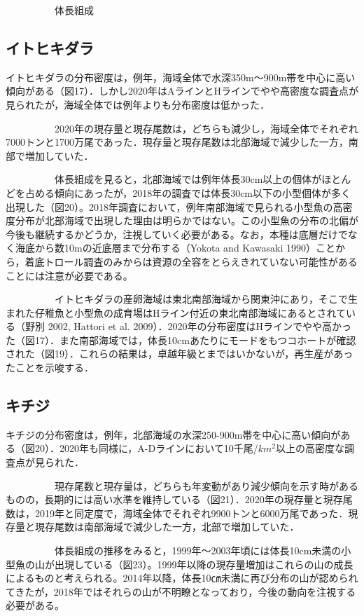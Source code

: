 \documentclass[11pt]{article} %
\begin{document}
\begin{linenumbers}
\ \ \ \ \ \ \ \ \ \ 
体長組成

\subsection{イトヒキダラ}
イトヒキダラの分布密度は，例年，海域全体で水深350m～900m帯を中心に高い傾向がある（図17）．しかし2020年はAラインとHラインでやや高密度な調査点が見られたが，海域全体では例年よりも分布密度は低かった．

\ \ \ \ \ \ \ \ \ \ 
2020年の現存量と現存尾数は，どちらも減少し，海域全体でそれぞれ7000トンと1700万尾であった．現存量と現存尾数は北部海域で減少した一方，南部で増加していた．

\ \ \ \ \ \ \ \ \ \ 
体長組成を見ると，北部海域では例年体長30cm以上の個体がほとんどを占める傾向にあったが，2018年の調査では体長30cm以下の小型個体が多く出現した（図20）。2018年調査において，例年南部海域で見られる小型魚の高密度分布が北部海域で出現した理由は明らかではない。この小型魚の分布の北偏が今後も継続するかどうか，注視していく必要がある。なお，本種は底層だけでなく海底から数10mの近底層まで分布する（Yokota and Kawasaki 1990）ことから，着底トロール調査のみからは資源の全容をとらえきれていない可能性があることには注意が必要である。

\ \ \ \ \ \ \ \ \ \ 
イトヒキダラの産卵海域は東北南部海域から関東沖にあり，そこで生まれた仔稚魚と小型魚の成育場はHライン付近の東北南部海域にあるとされている（野別 2002, Hattori et al. 2009）．2020年の分布密度はHラインでやや高かった（図17）．また南部海域では，体長10cmあたりにモードをもつコホートが確認された（図19）．これらの結果は，卓越年級とまではいかないが，再生産があったことを示唆する．

\subsection{キチジ}
キチジの分布密度は，例年，北部海域の水深250-900m帯を中心に高い傾向がある（図20）．2020年も同様に，A-Dラインにおいて10千尾/$km^2$以上の高密度な調査点が見られた．

\ \ \ \ \ \ \ \ \ \ 
現存尾数と現存量は，どちらも年変動があり減少傾向を示す時があるものの，長期的には高い水準を維持している（図21）．2020年の現存量と現存尾数は，2019年と同定度で，海域全体でそれぞれ9900トンと6000万尾であった．現存量と現存尾数は南部海域で減少した一方，北部で増加していた．

\ \ \ \ \ \ \ \ \ \ 
体長組成の推移をみると，1999年～2003年頃には体長10cm未満の小型魚の山が出現している（図23）。1999年以降の現存量増加はこれらの山の成長によるものと考えられる。2014年以降，体長10㎝未満に再び分布の山が認められてきたが，2018年ではそれらの山が不明瞭となっており，今後の動向を注視する必要がある。


\end{linenumbers}
\end{document}
